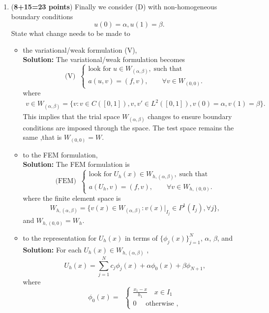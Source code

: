 \documentclass[11pt]{article}      %
\begin{document}
\begin{enumerate}
\begin{enumerate}
\item ({\bf 8+15=23 points})
 Finally we consider (D) with  non-homogeneous boundary conditions
$$
u(0)=\alpha, u(1)=\beta.
$$
State what change needs to be made  to 
\begin{itemize}
\item[(d.1)] the variational/weak formulation (V), \\
{\bf Solution:} The variational/weak formulation becomes 
\begin{displaymath}
	{\textrm{(V)}} \;\;\left\{
	\begin{array}{l}
		\mbox{look for} \; u\in W_{(\alpha,\beta)}, \; \mbox{such that}\\
		a(u, v)=(f, v),\qquad \forall v\in W_{(0,0)}.
	\end{array}
	\right.
\end{displaymath}
where
\begin{align*}
	v\in W_{(\alpha,\beta)} = \{v: v\in C([0,1]), v,v' \in L^2([0,1]), v(0)=\alpha,v(1)=\beta\}.
\end{align*}
This implies that the trial space $W_{(\alpha,\beta)}$ changes to ensure boundary conditions are imposed through the space. The test space remains the same ,that is $W_{(0,0)} = W$.
\item[(d.2)] to the FEM formulation, \\
{\bf Solution:} The FEM formulation is 
\begin{displaymath}
	{\textrm{(FEM)}} \;\;\left\{
	\begin{array}{l}
		\mbox{look for} \; U_h(x)\in W_{h,(\alpha,\beta)}, \; \mbox{such that}\\
		a(U_h, v)=(f, v),\qquad \forall v\in W_{h,(0,0)}.
	\end{array}
	\right.
\end{displaymath}
where the finite element space is
$$
W_{h,(\alpha,\beta)}=\{v(x)\in W_{(\alpha,\beta)}: v(x)|_{I_j}\in P^1(I_j), \forall j\},
$$
and  $W_{h,(0,0)} = W_h$.
\item[(d.3)] to the representation for $U_h(x)$ in terms of $\{\phi_j(x)\}_{j=1}^N$, $\alpha$, $\beta$, and \\
{\bf Solution: } For each $U_h(x) \in W_{h,(\alpha,\beta)}$ , 
$$U_h(x) = \sum_{j=1}^{N}c_j\phi_j(x) +\alpha \phi_0(x) +\beta\phi_{N+1}, $$
where
\begin{displaymath}
	\phi_0(x) = \;\;\left\{
	\begin{array}{l}
		\frac{x_1 - x}{h_1} \quad x\in I_1\\
		0 \quad \mbox{ otherwise },

\end{array}
\end{displaymath}
\end{itemize}
\end{enumerate}
\end{enumerate}
\end{document}
